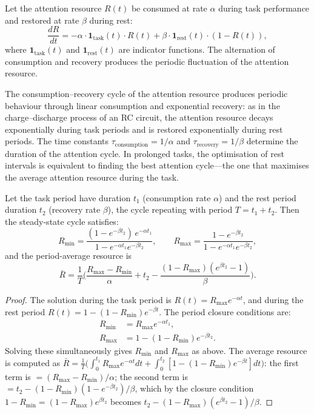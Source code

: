 \begin{proposition}\label{prop:attention_resource}
Let the attention resource $R(t)$ be consumed at rate $\alpha$ during task performance and restored at rate $\beta$ during rest:
\[
\frac{dR}{dt} = -\alpha \cdot \mathbf{1}_{\text{task}}(t) \cdot R(t) + \beta \cdot \mathbf{1}_{\text{rest}}(t) \cdot (1 - R(t)),
\]
where $\mathbf{1}_{\text{task}}(t)$ and $\mathbf{1}_{\text{rest}}(t)$ are indicator functions. The alternation of consumption and recovery produces the periodic fluctuation of the attention resource.

The consumption--recovery cycle of the attention resource produces periodic behaviour through linear consumption and exponential recovery: as in the charge--discharge process of an RC circuit, the attention resource decays exponentially during task periods and is restored exponentially during rest periods. The time constants $\tau_{\text{consumption}} = 1/\alpha$ and $\tau_{\text{recovery}} = 1/\beta$ determine the duration of the attention cycle. In prolonged tasks, the optimisation of rest intervals is equivalent to finding the best attention cycle---the one that maximises the average attention resource during the task.
\end{proposition}

\begin{lemma}\label{ch26_attention_cycle}
Let the task period have duration $t_1$ (consumption rate $\alpha$) and the rest period duration $t_2$ (recovery rate $\beta$), the cycle repeating with period $T = t_1 + t_2$. Then the steady-state cycle satisfies:
\[
R_{\min} = \frac{(1 - e^{-\beta t_2})\, e^{-\alpha t_1}}{1 - e^{-\alpha t_1} e^{-\beta t_2}}, \qquad
R_{\max} = \frac{1 - e^{-\beta t_2}}{1 - e^{-\alpha t_1} e^{-\beta t_2}},
\]
and the period-average resource is
\[
\bar R = \frac{1}{T}\Big( \frac{R_{\max} - R_{\min}}{\alpha} + t_2 - \frac{(1 - R_{\max})(e^{\beta t_2} - 1)}{\beta} \Big).
\]
\end{lemma}

\begin{proof}
The solution during the task period is $R(t) = R_{\max} e^{-\alpha t}$, and during the rest period $R(t) = 1 - (1 - R_{\min}) e^{-\beta t}$. The period closure conditions are:
\[
\begin{aligned}
R_{\min} &= R_{\max} e^{-\alpha t_1}, \\
R_{\max} &= 1 - (1 - R_{\min}) e^{-\beta t_2}.
\end{aligned}
\]
Solving these simultaneously gives $R_{\min}$ and $R_{\max}$ as above. The average resource is computed as $\bar R = \frac{1}{T}\big(\int_0^{t_1} R_{\max}e^{-\alpha t} dt + \int_0^{t_2} [1-(1-R_{\min})e^{-\beta t}] dt\big)$: the first term is $= (R_{\max}-R_{\min})/\alpha$; the second term is $= t_2 - (1-R_{\min})(1-e^{-\beta t_2})/\beta$, which by the closure condition $1 - R_{\min} = (1-R_{\max}) e^{\beta t_2}$ becomes $t_2 - (1-R_{\max})(e^{\beta t_2}-1)/\beta$.
\end{proof}

